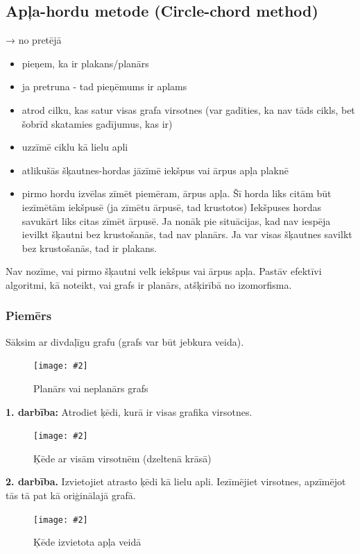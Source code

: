 \documentclass{article}
\newcommand{\illustration}[3]{
	\begin{figure}[H]
		\centering	
		\texttt{[image: \#2]}
		\caption{#3}
	\end{figure}
}
\begin{document}
\subsection{Apļa-hordu metode (Circle-chord method)}
→ no pretējā
\begin{itemize}
	\item pieņem, ka ir plakans/planārs
	\item ja pretruna - tad pieņēmums ir aplams
\end{itemize}

\begin{itemize}
	\item atrod cilku, kas satur visas grafa virsotnes (var gadīties, ka nav tāds cikls, bet šobrīd skatamies gadījumus, kas ir)
	\item uzzīmē ciklu kā lielu apli 
	\item atlikušās šķautnes-hordas jāzīmē iekšpus vai ārpus apļa plaknē
	\item pirmo hordu izvēlas zīmēt piemēram, ārpus apļa.
	\subitem Šī horda liks citām būt iezīmētām iekšpusē (ja zīmētu ārpusē, tad krustotos) Iekšpuses hordas savukārt liks citas zīmēt ārpusē.
	\subitem Ja nonāk pie situācijas, kad nav iespēja ievilkt šķautni bez krustošanās, tad nav planārs.
	\subitem Ja var visas šķautnes savilkt bez krustošanās, tad ir plakans. 
\end{itemize}

Nav nozīme, vai pirmo šķautni velk iekšpus vai ārpus apļa.  Pastāv efektīvi algoritmi, kā noteikt, vai grafs ir planārs, atšķirībā no izomorfisma.

\subsubsection{Piemērs}

Sāksim ar divdaļīgu grafu (grafs var būt jebkura veida). 
\illustration{0.5}{circle_chord_method-1}{Planārs vai neplanārs grafs }
	
\textbf{1. darbība:} Atrodiet ķēdi, kurā ir visas grafika virsotnes. 

\illustration{0.5}{circle_chord_method-2}{Ķēde ar visām virsotnēm (dzeltenā krāsā) }

\textbf{2. darbība.} Izvietojiet atrasto ķēdi kā lielu apli. Iezīmējiet virsotnes, apzīmējot tās tā pat kā oriģinālajā grafā. 

\illustration{0.5}{circle_chord_method-3}{Ķēde izvietota apļa veidā}
\end{document}
